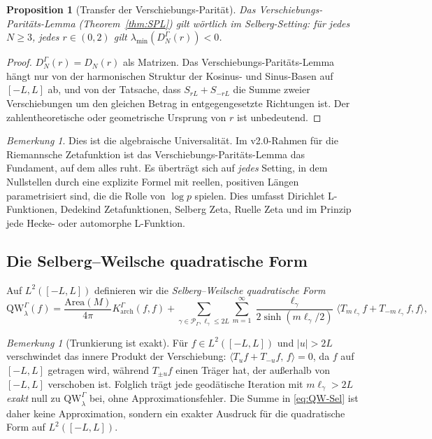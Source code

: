 \documentclass[12pt,a4paper]{article}
\newtheorem{proposition}[theorem]{Proposition}
\theoremstyle{definition}
\theoremstyle{remark}
\newtheorem{remark}[theorem]{Bemerkung}
\newcommand{\QW}{\mathrm{QW}}
\begin{document}
\begin{proposition}[Transfer der Verschiebungs-Parität]
\label{prop:SPL-transfer}
Das Verschiebungs-Paritäts-Lemma (Theorem~\ref{thm:SPL}) gilt wörtlich im Selberg-Setting:
für jedes $N \ge 3$, jedes $r \in (0,2)$ gilt
$\lambda_{\min}(D^\Gamma_N(r)) < 0$.
\end{proposition}

\begin{proof}
$D^\Gamma_N(r) = D_N(r)$ als Matrizen. Das Verschiebungs-Paritäts-Lemma hängt nur von
der harmonischen Struktur der Kosinus- und Sinus-Basen auf $[-L, L]$ ab, und von der
Tatsache, dass $S_{rL}+S_{-rL}$ die Summe zweier Verschiebungen um den gleichen Betrag in
entgegengesetzte Richtungen ist. Der zahlentheoretische oder geometrische Ursprung von $r$ ist
unbedeutend.
\end{proof}

\begin{remark}
Dies ist die algebraische Universalität. Im v2.0-Rahmen für die Riemannsche
Zetafunktion ist das Verschiebungs-Paritäts-Lemma das Fundament, auf dem alles ruht. Es
überträgt sich auf \emph{jedes} Setting, in dem Nullstellen durch eine explizite
Formel mit reellen, positiven Längen parametrisiert sind, die die Rolle von $\log p$ spielen. Dies
umfasst Dirichlet L-Funktionen, Dedekind Zetafunktionen, Selberg Zeta,
Ruelle Zeta und im Prinzip jede Hecke- oder automorphe L-Funktion.
\end{remark}

\subsection{\texorpdfstring{Die Selberg--Weilsche quadratische Form}{Die Selberg--Weilsche quadratische Form}}

Auf $L^2([-L, L])$ definieren wir die \emph{Selberg--Weilsche quadratische Form}
\begin{equation}
\label{eq:QW-Sel}
\QW^\Gamma_\lambda(f) = \frac{\mathrm{Area}(M)}{4\pi}K_\mathrm{arch}^\Gamma(f,f)
+ \sum_{\gamma \in \mathcal{P}_\Gamma, \ell_\gamma\le 2L}\sum_{m=1}^\infty
\frac{\ell_\gamma}{2\sinh(m\ell_\gamma/2)}\langle T_{m\ell_\gamma} f + T_{-m\ell_\gamma}f, f\rangle,
\end{equation}
\begin{remark}[Trunkierung ist exakt]
\label{rem:truncation-exact}
Für $f \in L^2([-L,L])$ und $|u| > 2L$ verschwindet das innere Produkt der Verschiebung:
$\langle T_u f + T_{-u}f,\, f\rangle = 0$, da $f$ auf $[-L,L]$ getragen wird,
während $T_{\pm u}f$ einen Träger hat, der außerhalb von $[-L,L]$ verschoben ist.  Folglich
trägt jede geodätische Iteration mit $m\ell_\gamma > 2L$ \emph{exakt} null
zu $\QW^\Gamma_\lambda$ bei, ohne Approximationsfehler.  Die Summe in
\eqref{eq:QW-Sel} ist daher keine Approximation, sondern ein exakter Ausdruck
für die quadratische Form auf $L^2([-L,L])$.
\end{remark}
\end{document}
